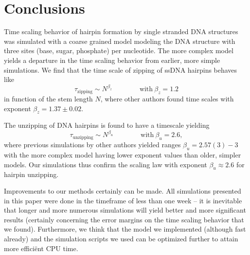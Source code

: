 \section{Conclusions}

Time scaling behavior of hairpin formation by single stranded DNA structures was simulated with a coarse grained model modeling the DNA structure with three sites (base, sugar, phosphate) per nucleotide. The more complex model yields a departure in the time scaling behavior from earlier, more simple simulations. We find that the time scale of zipping of ssDNA hairpins behaves like
\begin{equation}
\tau_\text{zipping} \sim N^{\beta_z} \qquad \qquad \text{with}\ \beta_z = 1.2
\end{equation}
in function of the stem length $N$, where other authors found time scales with exponent  $\beta_z = 1.37 \pm 0.02$.

The unzipping of DNA hairpins is found to have a timescale yielding
\begin{equation}
\tau_\text{unzipping} \sim N^{\beta_u} \qquad \qquad \text{with}\ \beta_u = 2.6,
\end{equation}
where previous simulations by other authors yielded ranges $\beta_u = 2.57(3) - 3$ with the more complex model having lower exponent values than older, simpler models. Our simulations thus confirm the scaling law with exponent $\beta_u \approx 2.6$ for hairpin unzipping.

Improvements to our methods certainly can be made. All simulations presented in this paper were done in the timeframe of less than one week -- it is inevitable that longer and more numerous simulations will yield better and more significant results (certainly concerning the error margins on the time scaling behavior that we found). Furthermore, we think that the model we implemented (although fast already) and the simulation scripts we used can be optimized further to attain more effici\"ent CPU time.